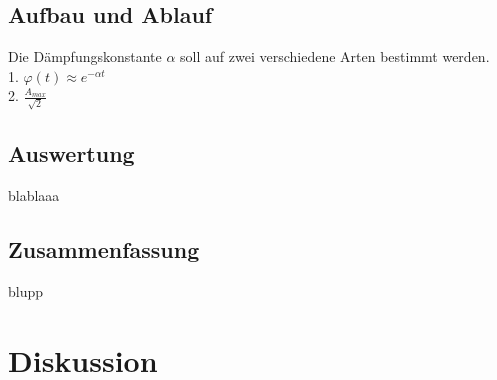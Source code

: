 \documentclass[12pt,a4paper]{article}
\begin{document}
\subsection*{Aufbau und Ablauf}
Die D\"ampfungskonstante $\alpha$ soll auf zwei verschiedene Arten bestimmt werden.\\
1. $\varphi(t) \approx e^{-\alpha t}$ \\
2. $\frac{A_{max}}{\sqrt{2}}$\\

\subsection*{Auswertung}
blablaaa

\subsection*{Zusammenfassung}
blupp

\section*{Diskussion}
\end{document}
